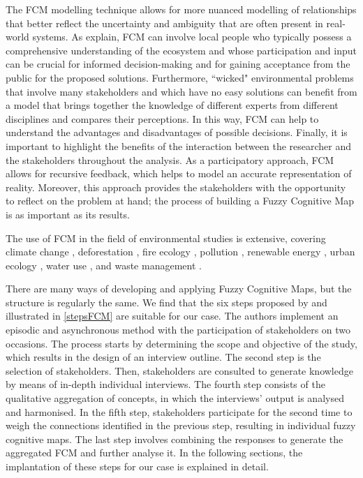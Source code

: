 The FCM modelling technique allows for more nuanced modelling of relationships that better reflect the uncertainty and ambiguity that are often present in real-world systems. As \cite{ozesmi2004ecological} explain, FCM can involve local people who typically possess a comprehensive understanding of the ecosystem and whose participation and input can be crucial for informed decision-making and for gaining acceptance from the public for the proposed solutions. Furthermore, ``wicked" environmental problems that involve many stakeholders and which have no easy solutions can benefit from a model that brings together the knowledge of different experts from different disciplines and compares their perceptions. In this way, FCM can help to understand the advantages and disadvantages of possible decisions. Finally, it is important to highlight the benefits of the interaction between the researcher and the stakeholders throughout the analysis. As a participatory approach, FCM allows for recursive feedback, which helps to model an accurate representation of reality. Moreover, this approach provides the stakeholders with the opportunity to reflect on the problem at hand; the process of building a Fuzzy Cognitive Map is as important as its results. 

The use of FCM in the field of environmental studies is extensive, covering climate change \citep{kontogianni2012you, singh2014livelihood, reckien2014weather}, deforestation \citep{kok2009potential}, fire ecology \citep{devisscher2016anticipating, eriksson2022using}, pollution \citep{anezakis2016fuzzy, salberg2022assessing, ozesmi2003participatory}, renewable energy \citep{jetter2011building, alipour2019characteristics, kyriakarakos2014fuzzy}, urban ecology \citep{assunccao2020rethinking, olazabal2016use}, water use \citep{giordano2005fuzzy, kafetzis2010using}, and waste management \citep{falcone2020use, morone2021using, kokkinos2018fuzzy, konti2018exploring}. 

There are many ways of developing and applying Fuzzy Cognitive Maps, but the structure is regularly the same. We find that the six steps proposed by \cite{edwards2021building} and illustrated in \cref{stepsFCM} are suitable for our case. The authors implement an episodic and asynchronous method with the participation of stakeholders on two occasions. The process starts by determining the scope and objective of the study, which results in the design of an interview outline. The second step is the selection of stakeholders. Then, stakeholders are consulted to generate knowledge by means of in-depth individual interviews. The fourth step consists of the qualitative aggregation of concepts, in which the interviews' output is analysed and harmonised. In the fifth step, stakeholders participate for the second time to weigh the connections identified in the previous step, resulting in individual fuzzy cognitive maps. The last step involves combining the responses to generate the aggregated FCM and further analyse it. In the following sections, the implantation of these steps for our case is explained in detail.

